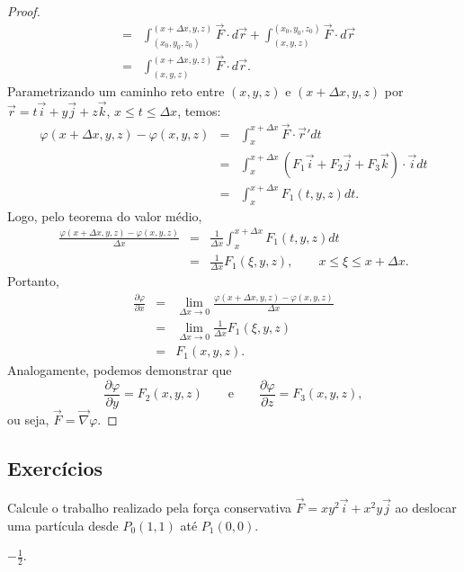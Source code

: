 \begin{proof}
\begin{eqnarray*}
&=&\int_{(x_0,y_0,z_0)}^{(x+\Delta x,y,z)} \vec{F}\cdot d\vec{r}+\int^{(x_0,y_0,z_0)}_{(x,y,z)} \vec{F}\cdot d\vec{r}\\
&=&\int_{(x,y,z)}^{(x+\Delta x,y,z)} \vec{F}\cdot d\vec{r}.
\end{eqnarray*}
Parametrizando um caminho reto entre $(x,y,z)$ e $(x+\Delta x,y,z)$ por $\vec{r}=t\vec{i}+y\vec{j}+z\vec{k}$, $x\leq t\leq \Delta x$, temos:
\begin{eqnarray*}
\varphi(x+\Delta x,y,z)-\varphi(x,y,z)&=&\int_x^{x+\Delta x} \vec{F}\cdot \vec{r}' dt \\
&=&\int_x^{x+\Delta x} \left(F_1\vec{i}+F_2\vec{j}+F_3\vec{k}\right)\cdot \vec{i} dt\\
&=&\int_x^{x+\Delta x} F_1 (t,y,z) dt .
\end{eqnarray*}
Logo, pelo teorema do valor médio,
\begin{eqnarray*}
\frac{\varphi(x+\Delta x,y,z)-\varphi(x,y,z)}{\Delta x}&=& \frac{1}{\Delta x}\int_x^{x+\Delta x} F_1 (t,y,z) dt\\
&=& \frac{1}{\Delta x}  F_1 (\xi,y,z) , \qquad x\leq \xi\leq x+\Delta x.
\end{eqnarray*}
Portanto,
\begin{eqnarray*}
\frac{\partial \varphi}{\partial x}&=&\lim_{\Delta x\to 0}\frac{\varphi(x+\Delta x,y,z)-\varphi(x,y,z)}{\Delta x}\\
&=&\lim_{\Delta x\to 0} \frac{1}{\Delta x}  F_1 (\xi,y,z)\\
&=&F_1 (x,y,z).
\end{eqnarray*}
Analogamente, podemos demonstrar que
$$
\frac{\partial \varphi}{\partial y}=F_2(x,y,z) \qquad \text{e}\qquad \frac{\partial \varphi}{\partial z}=F_3(x,y,z),
$$
ou seja, $\vec{F}=\vec{\nabla}\varphi.$
\end{proof}

\subsection*{Exercícios}
\begin{exer}Calcule o trabalho realizado pela força conservativa $\vec{F}=xy^2\vec{i}+x^2y\vec{j}$ ao deslocar uma partícula desde $P_0(1,1)$ até $P_1(0,0)$.
\end{exer}
\begin{resp}
 $-\frac{1}{2}$.
\end{resp}


